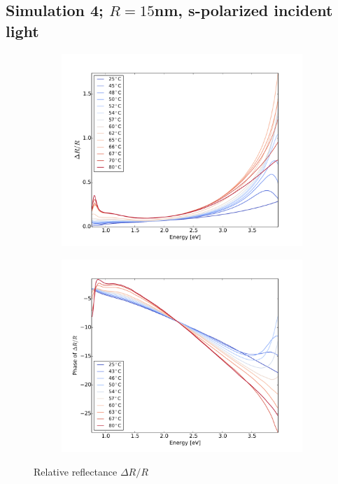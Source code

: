 \subsection{Simulation 4; $R = 15$nm, s-polarized incident light}
%
\begin{figure}
    \centering
    \begin{subfigure}[b]{0.49\textwidth}
        \centering
        \includegraphics[width=\textwidth]{Results/Sim4/dR.pdf}
        \caption{}
        \label{fig:}
    \end{subfigure}
    \begin{subfigure}[b]{0.49\textwidth}
        \centering
        \includegraphics[width=\textwidth]{Results/Sim4/dRphase.pdf}
        \caption{}
        \label{fig:}
    \end{subfigure}
    \caption{Relative reflectance $\Delta R/R$}
    \label{fig:1}
\end{figure}
